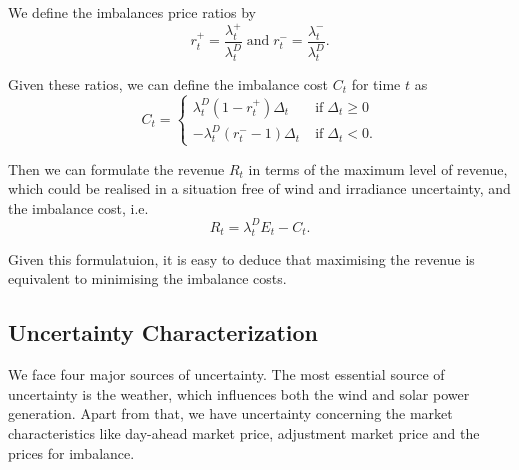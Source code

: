 {We define the imbalances price ratios by  
\begin{equation*}
r_{t}^{+}= \frac{\lambda_{t}^{+}}{\lambda_{t}^{D}} \mathrm{\; and \;} r_{t}^{-}=\frac{\lambda_{t}^{-}}{\lambda_{t}^{D}}.
\end{equation*}

Given these ratios, we can define the imbalance cost $C_t$ for time $t$ as
\begin{equation*}
C_{t}=\begin{cases}
\lambda_{t}^D\left(1-r_{t}^{+}\right)\Delta_{t} &\mathrm{\; if \;} \Delta_{t}\ge 0
\\ -\lambda_{t}^{D}\left(r_{t}^{-}-1\right)\Delta_{t} &\mathrm{\; if \;} \Delta_{t}<0.
\end{cases}
\end{equation*}

Then we can formulate the revenue $R_t$ in terms of the maximum level of revenue, which could be realised in a situation free of wind and irradiance uncertainty, and the imbalance cost, i.e. 
\begin{equation*}
R_{t}=\lambda_{t}^{D}E_{t}-C_{t}.
\end{equation*}

Given this formulatuion, it is easy to deduce that maximising the revenue is equivalent to minimising the imbalance costs.

\subsection{Uncertainty Characterization}

We face four major sources of uncertainty. The most essential source of uncertainty is the weather, which influences both the wind and solar power generation. Apart from that, we have uncertainty concerning the market characteristics like day-ahead market price, adjustment market price and the prices for imbalance.

}
